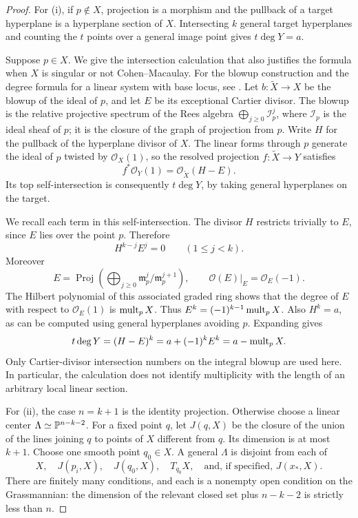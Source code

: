 \begin{proof}
For (i), if $p\notin X$, projection is a morphism and the pullback of
a target hyperplane is a hyperplane section of $X$.  Intersecting $k$
general target hyperplanes and counting the $t$ points over a general
image point gives $t\deg Y=a$.

Suppose $p\in X$.  We give the intersection calculation that also
justifies the formula when $X$ is singular or not Cohen--Macaulay.
For the blowup construction and the degree formula for a linear system
with base locus, see \cite[Appendix~B.6 and Proposition~4.4]{fulton1998}.
Let $b:\widetilde X\longrightarrow X$ be the blowup of the ideal of
$p$, and let $E$ be its exceptional Cartier divisor.  The blowup is
the relative projective spectrum of the Rees algebra
$\bigoplus_{j\ge0}\mathcal I_p^j$, where $\mathcal I_p$ is the ideal
sheaf of $p$; it is the closure of the graph of
projection from $p$.  Write $H$ for the pullback of the hyperplane
divisor of $X$.  The linear forms through $p$ generate the ideal of
$p$ twisted by $\mathcal O_X(1)$, so the resolved projection
$f:\widetilde X\longrightarrow Y$ satisfies
\[
 f^*\mathcal O_Y(1)=\mathcal O_{\widetilde X}(H-E).
\]
Its top self-intersection is consequently $t\deg Y$, by taking
general hyperplanes on the target.

We recall each term in this self-intersection.  The divisor $H$
restricts trivially to $E$, since $E$ lies over the point $p$.
Therefore
\[
 H^{k-j}E^j=0\qquad(1\le j<k).
\]
Moreover
\[
 E=\operatorname{Proj}\!\left(
       \bigoplus_{j\ge0}\mathfrak m_p^j/\mathfrak m_p^{j+1}\right),
 \qquad \mathcal O(E)|_E=\mathcal O_E(-1).
\]
The Hilbert polynomial of this associated graded ring shows that
the degree of $E$ with respect to $\mathcal O_E(1)$ is
$\operatorname{mult}_pX$.  Thus $E^k=(-1)^{k-1}\operatorname{mult}_pX$.  Also $H^k=a$, as can
be computed using general hyperplanes avoiding $p$.  Expanding gives
\[
 t\deg Y=(H-E)^k=a+(-1)^kE^k=a-\operatorname{mult}_pX.
\]
Only Cartier-divisor intersection numbers on the integral blowup are
used here.  In particular, the calculation does not identify
multiplicity with the length of an arbitrary local linear section.

For (ii), the case $n=k+1$ is the identity projection.  Otherwise
choose a linear center $\Lambda\simeq\mathbb P^{n-k-2}$.  For a fixed point
$q$, let $J(q,X)$ be the closure of the union of the lines joining
$q$ to points of $X$ different from $q$.  Its dimension is at most
$k+1$.  Choose one smooth point $q_0\in X$.  A general $\Lambda$
is disjoint from each of
\[
 X,\quad J(p_i,X),\quad J(q_0,X),\quad T_{q_0}X,
 \quad\text{and, if specified, }J(x_*,X).
\]
There are finitely many conditions, and each is a nonempty open
condition on the Grassmannian: the dimension of the relevant closed
set plus $n-k-2$ is strictly less than $n$.


\end{proof}
